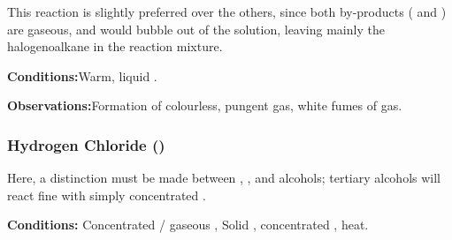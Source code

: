 				This reaction is slightly preferred over the others, since both by-products ( and ) are
				gaseous, and would bubble out of the solution, leaving mainly the halogenoalkane in the reaction mixture.

				\vspace{1.5em}
				\vbox{\textbf{Conditions:}\tabto{35mm}Warm, liquid .}

				\vspace{0.75em}
				\vbox{\textbf{Observations:}\tabto{35mm}Formation of colourless, pungent  gas,
											\tabto{35mm}white fumes of  gas.}


			\pagebreak
			\subsubsection{Hydrogen Chloride ()}

				Here, a distinction must be made between , , and  alcohols;
				tertiary alcohols will react fine with simply concentrated .

				\vspace{1.5em}
				\vbox{\textbf{Conditions:}	\tabto{35mm}Concentrated  / gaseous , 
											\tabto{35mm}Solid , concentrated , heat.}



